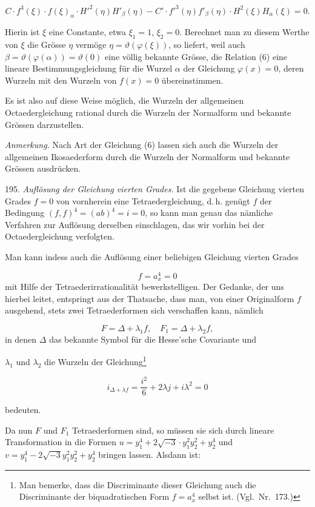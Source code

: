 \documentclass[11pt]{article}
\providecommand{\weberpage}[1]{}
\providecommand{\weq}[2]{\begin{equation}\tag{#1}#2\end{equation}}
\let\Delta\varDelta
\begin{document}
\weq{6}{C\cdot f^3(\xi)\cdot f(\xi)_\alpha\cdot H'^2(\eta) H'_\beta(\eta) - C'\cdot f'^3(\eta)f'_\beta(\eta)\cdot H^2(\xi) H_\alpha(\xi) = 0.}

Hierin ist $\xi$ eine Constante, etwa $\xi_1=1$, $\xi_2=0$. Berechnet man zu diesem Werthe von $\xi$ die Grösse $\eta$ vermöge $\eta=\vartheta(\varphi(\xi))$, so liefert, weil auch $\beta=\vartheta(\varphi(\alpha))=\vartheta(0)$ eine völlig bekannte Grösse, die Relation (6) eine lineare Bestimmungsgleichung für die Wurzel $\alpha$ der Gleichung $\varphi(x)=0$, deren Wurzeln mit den Wurzeln von $f(x)=0$ übereinstimmen.

Es ist also auf diese Weise möglich, die Wurzeln der allgemeinen Octaedergleichung rational durch die Wurzeln der Normalform und bekannte Grössen darzustellen.

\textit{Anmerkung.} Nach Art der Gleichung (6) lassen sich auch die Wurzeln der allgemeinen Ikosaederform durch die Wurzeln der Normalform und bekannte Grössen ausdrücken.

195. \textit{Auflösung der Gleichung vierten Grades.} Ist die gegebene Gleichung vierten Grades $f=0$ von vornherein eine Tetraedergleichung, d.\,h. genügt $f$ der Bedingung $(f,f)^4=(ab)^4=i=0$, so kann man genau das nämliche Verfahren zur Auflösung derselben einschlagen, das wir vorhin bei der Octaedergleichung verfolgten.

Man kann indess auch die Auflösung einer beliebigen Gleichung vierten Grades

\[
f = a_x^4 = 0
\]
mit Hilfe der Tetraederirrationalität bewerkstelligen. Der Gedanke, der uns hierbei leitet, entspringt aus der Thatsache, dass man, von einer Originalform $f$ ausgehend, stets zwei Tetraederformen sich verschaffen kann, nämlich

\[
F = \Delta+\lambda_1 f,\quad F_1=\Delta+\lambda_2 f,
\]
in denen $\Delta$ das bekannte Symbol für die Hesse'sche Covariante und


\weberpage{218}
$\lambda_1$ und $\lambda_2$ die Wurzeln der Gleichung\footnote{Man bemerke, dass die Discriminante dieser Gleichung auch die Discriminante der biquadratischen Form $f=a_x^4$ selbst ist. (Vgl.\ Nr.\ 173.)}

\weq{1}{i_{\Delta+\lambda f} = \frac{i^2}{6} + 2\lambda j + i\lambda^2 = 0}

bedeuten.

Da nun $F$ und $F_1$ Tetraederformen sind, so müssen sie sich durch lineare Transformation in die Formen $u = y_1^4 + 2\sqrt{-3}\cdot y_1^2y_2^2+y_2^4$ und $v=y_1^4-2\sqrt{-3}y_1^2y_2^2+y_2^4$ bringen lassen. Alsdann ist:
\end{document}
